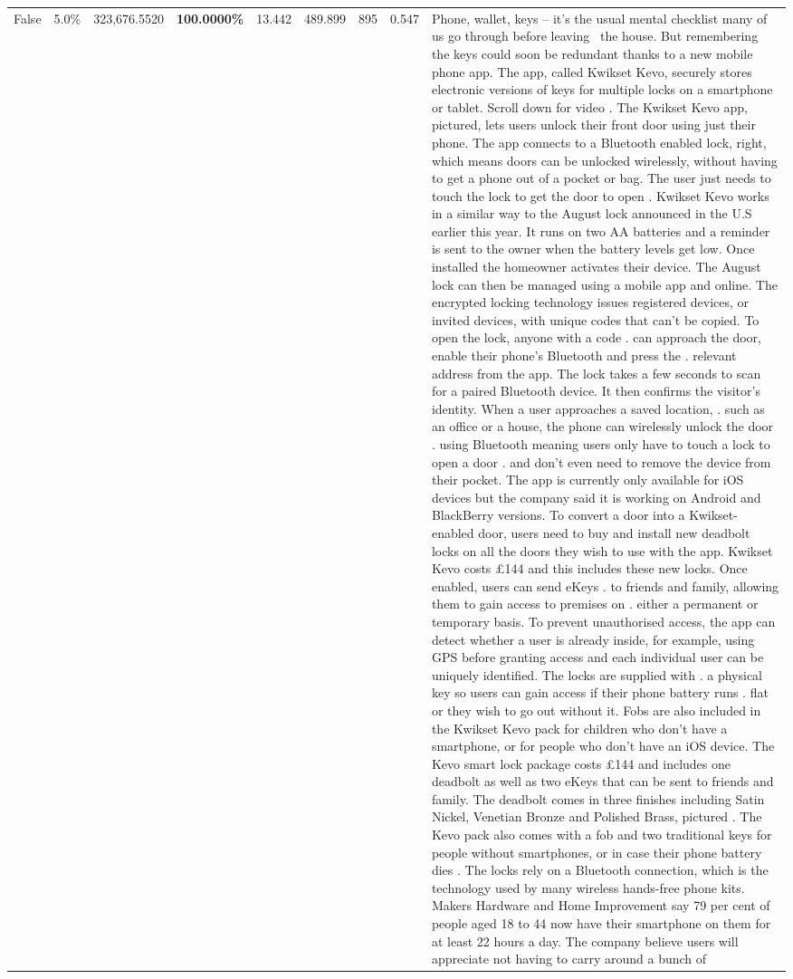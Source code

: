 \begin{table}[H]
\begin{tabular}{lllrlllll}
False & 5.0\% & 323,676.5520 & \bfseries \color{red} 100.0000\% & 13.442 & 489.899 & 895 & 0.547 & Phone, wallet, keys – it’s the usual mental checklist many of us go through before leaving  the house. But remembering the keys could soon be redundant thanks to a new mobile phone app. The app, called Kwikset Kevo, securely stores electronic versions of keys for multiple locks on a smartphone or tablet. Scroll down for video . The Kwikset Kevo app, pictured, lets users unlock their front door using just their phone. The app connects to a Bluetooth enabled lock, right, which means doors can be unlocked wirelessly, without having to get a phone out of a pocket or bag. The user just needs to touch the lock to get the door to open . Kwikset Kevo works in a similar way to the August lock announced in the U.S earlier this year. It runs on two AA batteries and a reminder is sent to the owner when the battery levels get low. Once installed the homeowner activates their device. The August lock can then be managed using a mobile app and online. The encrypted locking technology issues registered devices, or invited devices, with unique codes that can't be copied. To open the lock, anyone with a code . can approach the door, enable their phone's Bluetooth and press the . relevant address from the app. The lock takes a few seconds to scan for a paired Bluetooth device. It then confirms the visitor's identity. When a user approaches a saved location, . such as an office or a house, the phone can wirelessly unlock the door . using Bluetooth meaning users only have to touch a lock to open a door . and don't even need to remove the device from their pocket. The app is currently only available for iOS devices but the company said it is working on Android and BlackBerry versions. To convert a door into a Kwikset-enabled door, users need to buy and install new deadbolt locks on all the doors they wish to use with the app. Kwikset Kevo costs £144 and this includes these new locks. Once enabled, users can send eKeys . to friends and family, allowing them to gain access to premises on . either a permanent or temporary basis. To prevent unauthorised access, the app can detect whether a user is already inside, for example, using GPS before granting access and each individual user can be uniquely identified. The locks are supplied with . a physical key so users can gain access if their phone battery runs . flat or they wish to go out without it. Fobs are also included in the Kwikset Kevo pack for children who don't have a smartphone, or for people who don't have an iOS device. The Kevo smart lock package costs £144 and includes one deadbolt as well as two eKeys that can be sent to friends and family. The deadbolt comes in three finishes including Satin Nickel, Venetian Bronze and Polished Brass, pictured . The Kevo pack also comes with a fob and two traditional keys for people without smartphones, or in case their phone battery dies . The locks rely on a Bluetooth connection, which is the technology used by many wireless hands-free phone kits. Makers Hardware and Home Improvement say 79 per cent of people aged 18 to 44 now have their smartphone on them for at least 22 hours a day. The company believe users will appreciate not having to carry around a bunch of 
\end{tabular}
\end{table}
